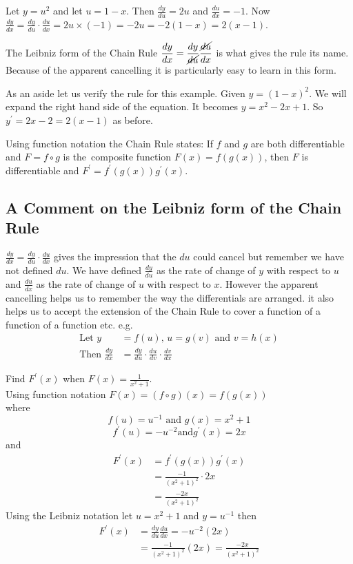 Let
$y =u^{2}$ and let $u =1 -x$. Then $\frac{d y}{d u} =2 u$ and $\frac{d u}{d x} = -1$. Now $\frac{d y}{d x} =\frac{d y}{d u} \cdot \frac{d u}{d x} =2 u \times ( -1) = -2 u = -2 (1 -x) =2 (x -1)$. 

The Leibniz form of the Chain Rule $\displaystyle \frac{d y}{d x} =\frac{d y}{\cancel{d u}} \frac{\cancel{d u}}{d x}$ is what gives the rule its name. Because of the apparent cancelling it is particularly
easy to learn in this form. 

As an aside let us verify the rule for this example. Given
$y =(1 -x)^{2}$. We will expand the right hand side of the equation. It
becomes $y =x^{2} -2 x +1$. So $y^{ \prime } =2 x -2 =2 (x -1)$ as before. 

Using function notation the Chain Rule states: If $f$ and $g$ are both differentiable and $F =f \circ g$ is the\ composite function $F (x) =f (g (x))$, then $F$ is differentiable and $F^{ \prime } =f^{ \prime } (g (x)) g^{ \prime } (x)$. 

\subsection*{A Comment on the Leibniz form of the Chain Rule}
$\frac{d y}{d x} =\frac{d y}{d u} \cdot \frac{d u}{d x}$ gives the impression that the $d u$ could cancel but remember we have not defined $d u$. We have defined $\frac{d y}{d u}$ as the rate of change of $y$ with respect to $u$ and $\frac{d u}{d x}$ as the rate of change of $u$ with respect to $x$. However the apparent cancelling helps us to remember the way the differentials
are arranged. it also helps us to accept the extension of the Chain Rule to cover a function of a function of
a function etc. e.g.
\begin{align*}\text{Let }y &  = f (u)\text{, }u =g (v)\text{ and }v =h (x) \\
\text{Then }\frac{d y}{d x} &  = \frac{d y}{d u} \cdot \frac{d u}{d v} \cdot \frac{d v}{d x}\end{align*}

\example Find $F^{ \prime } (x)$ when $F (x) =\frac{1}{x^{2} +1}$. \\
\solution Using function notation $F (x) =\left (f \circ g\right ) (x) =f (g (x))$ \\
where $$f (u) =u^{ -1} \text{ and }g (x) =x^{2} +1$$
\begin{equation*}f^{ \prime } (u) = -u^{ -2}\text{and}g^{ \prime } (x) =2 x
\end{equation*}
and 
\begin{align*}F^{ \prime } (x) &  = f^{ \prime } (g (x)) g^{ \prime } (x) \\
 &  = \frac{ -1}{(x^{2} +1)^{2}} \cdot 2 x \\
 &  = \frac{ -2 x}{\left (x^{2} +1\right )^{2}}\end{align*}
Using the Leibniz notation let $u =x^{2} +1$ and $y =u^{ -1}$ then
\begin{align*}F^{ \prime } (x) &  = \frac{d y}{d u} \frac{d u}{d x} = -u^{ -2} \left (2 x\right ) \\
 &  = \frac{ -1}{\left (x^{2} +1\right )^{2}} \left (2 x\right ) =\frac{ -2 x}{\left (x^{2} +1\right )^{2}}\end{align*}

